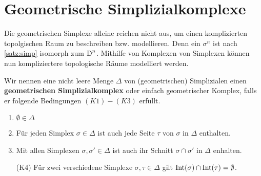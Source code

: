 
\section{Geometrische Simplizialkomplexe}

Die geometrischen Simplexe alleine reichen nicht aus, um einen
komplizierten topolgischen Raum zu beschreiben bzw. modellieren. Denn
ein $\sigma^n$ ist nach \cref{satz:simp} isomorph zum $\operatorname{D}^n$.  Mithilfe
von Komplexen von Simplexen können nun kompliziertere topologische
Räume modelliert werden.

\begin{Def}
  Wir nennen eine nicht leere Menge $\Delta$ von (geometrischen) Simplizialen
  einen \textbf{geometrischen Simplizialkomplex} oder einfach
  geometrischer Komplex, falls er folgende Bedingungen $(K1) - (K3)$
  erfüllt.
  \begin{enumerate}[(K1)]
  \item $\emptyset \in \Delta$
  \item Für jeden Simplex $\sigma \in \Delta$ ist auch jede Seite
    $\tau$ von $\sigma$ in $\Delta$ enthalten.
  \item Mit allen Simplexen $\sigma, \sigma' \in \Delta$ ist auch ihr
    Schnitt $\sigma \cap \sigma'$ in $\Delta$ enhalten.
  \item[(K4)] Für zwei verschiedene Simplexe $\sigma,\tau \in \Delta$
    gilt $\operatorname{Int}(\sigma) \cap \operatorname{Int}(\tau) = \emptyset$.
  \end{enumerate}
\end{Def}


